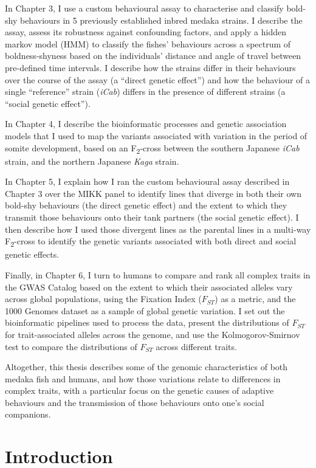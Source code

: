 \documentclass[
]{book}
\begin{document}
In Chapter 3, I use a custom behavioural assay to characterise and classify bold-shy behaviours in 5 previously established inbred medaka strains. I describe the assay, assess its robustness against confounding factors, and apply a hidden markov model (HMM) to classify the fishes' behaviours across a spectrum of boldness-shyness based on the individuals' distance and angle of travel between pre-defined time intervals. I describe how the strains differ in their behaviours over the course of the assay (a ``direct genetic effect'') and how the behaviour of a single ``reference'' strain (\emph{iCab}) differs in the presence of different strains (a ``social genetic effect'').

In Chapter 4, I describe the bioinformatic processes and genetic association models that I used to map the variants associated with variation in the period of somite development, based on an F\textsubscript{2}-cross between the southern Japanese \emph{iCab} strain, and the northern Japanese \emph{Kaga} strain.

In Chapter 5, I explain how I ran the custom behavioural assay described in Chapter 3 over the MIKK panel to identify lines that diverge in both their own bold-shy behaviours (the direct genetic effect) and the extent to which they transmit those behaviours onto their tank partners (the social genetic effect). I then describe how I used those divergent lines as the parental lines in a multi-way F\textsubscript{2}-cross to identify the genetic variants associated with both direct and social genetic effects.

Finally, in Chapter 6, I turn to humans to compare and rank all complex traits in the GWAS Catalog based on the extent to which their associated alleles vary across global populations, using the Fixation Index (\(F_{ST}\)) as a metric, and the 1000 Genomes dataset as a sample of global genetic variation. I set out the bioinformatic pipelines used to process the data, present the distributions of \(F_{ST}\) for trait-associated alleles across the genome, and use the Kolmogorov-Smirnov test to compare the distributions of \(F_{ST}\) across different traits.

Altogether, this thesis describes some of the genomic characteristics of both medaka fish and humans, and how those variations relate to differences in complex traits, with a particular focus on the genetic causes of adaptive behaviours and the transmission of those behaviours onto one's social companions.

\hypertarget{Introduction}{%
\chapter{Introduction}\label{Introduction}}
\end{document}
